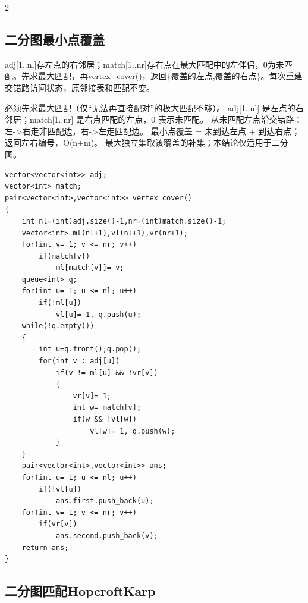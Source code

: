 \documentclass[UTF8,fontset=fandol,a4paper,twoside]{ctexart}
\newcommand{\note}[1]{{\fontsize{10}{12}\selectfont #1\par}}
\begin{document}
\begin{multicols}{2}
\subsection{二分图最小点覆盖}

\note{adj[\allowbreak{}1.\allowbreak{}.\allowbreak{}nl]\allowbreak{}存左点的右邻居；match[\allowbreak{}1.\allowbreak{}.\allowbreak{}nr]\allowbreak{}存右点在最大匹配中的左伴侣，0为未匹配。先求最大匹配，再vertex\_cover(\allowbreak{})\allowbreak{}，返回\{覆盖的左点,\allowbreak{}覆盖的右点\}。每次重建交错路访问状态，原邻接表和匹配不变。}
\note{必须先求最大匹配（仅“无法再直接配对”的极大匹配不够）。 adj[\allowbreak{}1.\allowbreak{}.\allowbreak{}nl]\allowbreak{} 是左点的右邻居；match[\allowbreak{}1.\allowbreak{}.\allowbreak{}nr]\allowbreak{} 是右点匹配的左点，0 表示未匹配。 从未匹配左点沿交错路：左-\allowbreak{}>\allowbreak{}右走非匹配边，右-\allowbreak{}>\allowbreak{}左走匹配边。 最小点覆盖 =\allowbreak{} 未到达左点 +\allowbreak{} 到达右点；返回左右编号，O(\allowbreak{}n+\allowbreak{}m)\allowbreak{}。 最大独立集取该覆盖的补集；本结论仅适用于二分图。}
\begin{lstlisting}
vector<vector<int>> adj;
vector<int> match;
pair<vector<int>,vector<int>> vertex_cover()
{
    int nl=(int)adj.size()-1,nr=(int)match.size()-1;
    vector<int> ml(nl+1),vl(nl+1),vr(nr+1);
    for(int v= 1; v <= nr; v++)
        if(match[v])
            ml[match[v]]= v;
    queue<int> q;
    for(int u= 1; u <= nl; u++)
        if(!ml[u])
            vl[u]= 1, q.push(u);
    while(!q.empty())
    {
        int u=q.front();q.pop();
        for(int v : adj[u])
            if(v != ml[u] && !vr[v])
            {
                vr[v]= 1;
                int w= match[v];
                if(w && !vl[w])
                    vl[w]= 1, q.push(w);
            }
    }
    pair<vector<int>,vector<int>> ans;
    for(int u= 1; u <= nl; u++)
        if(!vl[u])
            ans.first.push_back(u);
    for(int v= 1; v <= nr; v++)
        if(vr[v])
            ans.second.push_back(v);
    return ans;
}
\end{lstlisting}
\subsection{二分图匹配HopcroftKarp}


\end{multicols}
\end{document}
